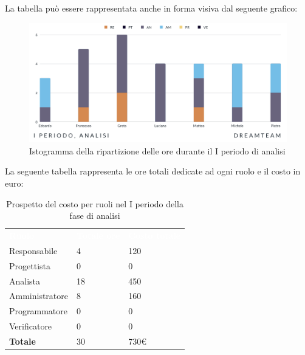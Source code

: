 La tabella può essere rappresentata anche in forma visiva dal seguente grafico:
\begin{figure}[H]
\centering
\includegraphics[scale=0.65]{Sezioni/SezioniPreventivo/grafici/Analisi_I_periodo.png}
\caption{Istogramma della ripartizione delle ore durante il I periodo di analisi}
\end{figure}

La seguente tabella rappresenta le ore totali dedicate ad ogni ruolo e il costo in euro:

\begin{table}[H]
\begin{center}
\renewcommand{\arraystretch}{1.5}
\begin{tabular}{ m{}<{\centering}  m{}<{\centering} m{}<{\centering}}
	\rowcolor{darkblue}
	\textcolor{white}{\textbf{Ruolo}}&\textcolor{white}{\textbf{Totale ore}}&\textcolor{white}{\textbf{Costo totale}}\\ 

	Responsabile  & 4 & 120 \\	
	
	Progettista & 0 & 0\\
	
	Analista & 18 & 450\\

	Amministratore & 8 & 160\\
	
	Programmatore & 0 & 0\\
	
	Verificatore & 0 & 0\\
	
	\textbf{Totale} & 30 & 730\euro \\
	
\end{tabular}
\caption{Prospetto del costo per ruoli nel I periodo della fase di analisi}
\end{center}
\end{table}

